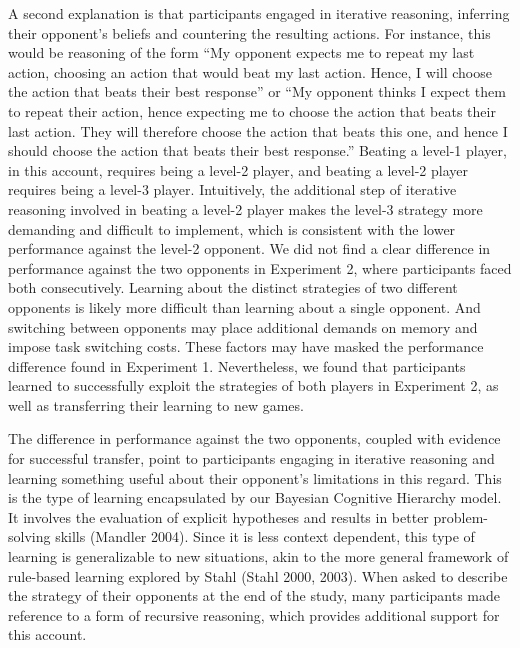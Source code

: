 \documentclass[smallextended]{svjour3}       %
\begin{document}
A second explanation is that participants engaged in iterative
reasoning, inferring their opponent's beliefs and countering the
resulting actions. For instance, this would be reasoning of the form
``My opponent expects me to repeat my last action, choosing an action
that would beat my last action. Hence, I will choose the action that
beats their best response'' or ``My opponent thinks I expect them to
repeat their action, hence expecting me to choose the action that beats
their last action. They will therefore choose the action that beats this
one, and hence I should choose the action that beats their best
response.'' Beating a level-1 player, in this account, requires being a
level-2 player, and beating a level-2 player requires being a level-3
player. Intuitively, the additional step of iterative reasoning involved
in beating a level-2 player makes the level-3 strategy more demanding
and difficult to implement, which is consistent with the lower
performance against the level-2 opponent. We did not find a clear
difference in performance against the two opponents in Experiment 2,
where participants faced both consecutively. Learning about the distinct
strategies of two different opponents is likely more difficult than
learning about a single opponent. And switching between opponents may
place additional demands on memory and impose task switching costs.
These factors may have masked the performance difference found in
Experiment 1. Nevertheless, we found that participants learned to
successfully exploit the strategies of both players in Experiment 2, as
well as transferring their learning to new games.

The difference in performance against the two opponents, coupled with
evidence for successful transfer, point to participants engaging in
iterative reasoning and learning something useful about their opponent's
limitations in this regard. This is the type of learning encapsulated by
our Bayesian Cognitive Hierarchy model. It involves the evaluation of
explicit hypotheses and results in better problem-solving skills
(Mandler 2004). Since it is less context dependent, this type of
learning is generalizable to new situations, akin to the more general
framework of rule-based learning explored by Stahl (Stahl 2000, 2003).
When asked to describe the strategy of their opponents at the end of the
study, many participants made reference to a form of recursive
reasoning, which provides additional support for this account.
\end{document}

